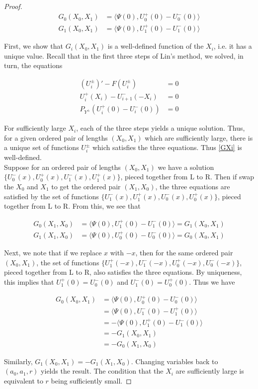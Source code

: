 \documentclass[thesis.tex]{subfiles}
\begin{document}
\begin{lemma}
\begin{proof}
\begin{align*}
G_0(X_0, X_1) &= \langle \Psi(0), U_0^+(0) - U_0^-(0) \rangle \\
G_1(X_0, X_1) &= \langle \Psi(0), U_1^+(0) - U_1^-(0) \rangle 
\end{align*}

First, we show that $G_i(X_0, X_1)$ is a well-defined function of the $X_i$, i.e. it has a unique value. Recall that in the first three steps of Lin's method, we solved, in turn, the equations

\begin{align*}
(U_i^\pm)' - F(U_i^\pm) &= 0 \\
U_i^+(X_i) - U_{i+1}^-(-X_i) &= 0 \\
P_{Y^\pm}(U_i^+(0) - U_i^-(0)) &= 0
\end{align*}

For sufficiently large $X_i$, each of the three steps yields a unique solution. Thus, for a given ordered pair of lengths $(X_0, X_1)$ which are sufficiently large, there is a unique set of functions $U_i^\pm$ which satisfies the three equations. Thus \eqref{GXi} is well-defined.\\

Suppose for an ordered pair of lengths $(X_0, X_1)$ we have a solution $\{ U_0^-(x), U_0^+(x), U_1^-(x), U_1^+(x) \}$, pieced together from L to R. Then if swap the $X_0$ and $X_1$ to get the ordered pair $(X_1, X_0)$, the three equations are satisfied by the set of functions $\{ U_1^-(x), U_1^+(x), U_0^-(x), U_0^+(x)\}$, pieced together from L to R. From this, we see that

\begin{align*}
G_0(X_1, X_0) &= \langle \Psi(0), U_1^+(0) - U_1^-(0) \rangle = G_1(X_0, X_1) \\
G_1(X_1, X_0) &= \langle \Psi(0), U_0^+(0) - U_0^-(0) \rangle = G_0(X_0, X_1)
\end{align*}

Next, we note that if we replace $x$ with $-x$, then for the same ordered pair $(X_0, X_1)$, the set of functions $\{ U_1^+(-x), U_1^-(-x), U_0^+(-x), U_0^-(-x)\}$, pieced together from L to R, also satisfies the three equations. By uniqueness, this implies that $U_1^+(0) = U_0^-(0)$ and $U_1^-(0) = U_0^+(0)$. Thus we have

\begin{align*}
G_0(X_0, X_1) &= \langle \Psi(0), U_0^+(0) - U_0^-(0) \rangle \\
&= \langle \Psi(0), U_1^-(0) - U_1^+(0) \rangle \\
&= -\langle \Psi(0), U_1^+(0) - U_1^-(0) \rangle \\
&= -G_1(X_0, X_1) \\
&= -G_0(X_1, X_0)
\end{align*}

Similarly, $G_1(X_0, X_1) = -G_1(X_1, X_0)$. Changing variables back to $(a_0, a_1, r)$ yields the result. The condition that the $X_i$ are sufficiently large is equivalent to $r$ being sufficiently small.
\end{proof}
\end{lemma}
\end{document}
